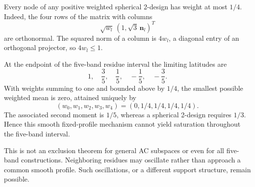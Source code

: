 \documentclass{article}
\begin{document}
Every node of any positive weighted spherical 2-design has weight at most
$1/4$. Indeed, the four rows of the matrix with columns
\[
 \sqrt{w_l}\,(1,\sqrt3\,\mathbf n_l)^T
\]
are orthonormal. The squared norm of a column is $4w_l$, a diagonal entry
of an orthogonal projector, so $4w_l\le1$.

At the endpoint of the five-band residue interval the limiting latitudes
are
\[
 1,\quad\frac35,\quad\frac15,\quad-\frac15,\quad-\frac35.
\]
With weights summing to one and bounded above by $1/4$, the smallest possible
weighted mean is zero, attained uniquely by
\[
 (w_0,w_1,w_2,w_3,w_4)=(0,1/4,1/4,1/4,1/4).
\]
The associated second moment is $1/5$, whereas a spherical 2-design requires
$1/3$. Hence this smooth fixed-profile mechanism cannot yield saturation
throughout the five-band interval.

This is not an exclusion theorem for general AC subspaces or even for all
five-band constructions. Neighboring residues may oscillate rather than
approach a common smooth profile. Such oscillations, or a different support
structure, remain possible.
\end{document}
